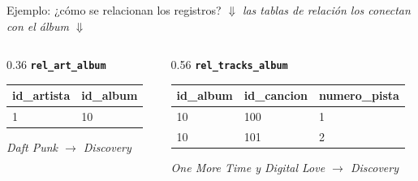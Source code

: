 \documentclass[aspectratio=169, 10pt]{beamer}
\begin{document}
\begin{frame}[t]{Ejemplo: ¿cómo se relacionan los registros?}
    \vspace{0.4cm}
    {\small $\Downarrow$ \textit{las tablas de relación los conectan con el álbum} $\Downarrow$}
    \vspace{0.4cm}

    \begin{columns}[T]
        \begin{column}{0.36\textwidth}
            \centering
            \textbf{\texttt{rel\_art\_album}}\par\vspace{0.1cm}
            \begin{tabular}{ll}
                \toprule
                \textbf{id\_artista} & \textbf{id\_album} \\
                \midrule
                1 & 10 \\
                \bottomrule
            \end{tabular}

            \vspace{0.15cm}
            \textit{Daft Punk $\rightarrow$ Discovery}
        \end{column}

        \begin{column}{0.56\textwidth}
            \centering
            \textbf{\texttt{rel\_tracks\_album}}\par\vspace{0.1cm}
            \begin{tabular}{lll}
                \toprule
                \textbf{id\_album} & \textbf{id\_cancion} & \textbf{numero\_pista} \\
                \midrule
                10 & 100 & 1 \\
                10 & 101 & 2 \\
                \bottomrule
            \end{tabular}

            \vspace{0.15cm}
            \textit{One More Time y Digital Love $\rightarrow$ Discovery}
        \end{column}
    \end{columns}
\end{frame}
\end{document}
